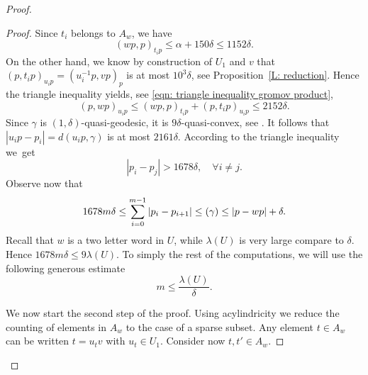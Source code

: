 \documentclass[11pt]{article}
\newcommand{\NoChangel}[1]{%
\expandafter\let\csname old\string#1\endcsname=#1
\let#1=\relax
\newcommand{#1}{\mathcode`l="716C\csname old\string#1\endcsname\mathcode`l="7160 }%
}
\theoremstyle{plain}
\theoremstyle{definition}
\DeclareMathOperator{\length}{length}\NoChangel{\length}
\begin{document}
\begin{proof}
\begin{proof}
Since $t_i$ belongs to $A_w$, we have
\begin{equation*}
(wp,p)_{t_ip} \leq \alpha + 150\delta \leq 1152\delta.
\end{equation*}
On the other hand, we know by construction of $U_1$ and $v$ that $(p,t_ip)_{u_ip} = (u_i^{-1}p,vp)_p$ is at most $10^3\delta$, see Proposition~\ref{L: reduction}.
Hence the triangle inequality yields, see \eqref{eqn: triangle inequality gromov product},
\begin{equation*}
(p,wp)_{u_ip} \leq (wp,p)_{t_ip} + (p,t_ip)_{u_ip} \leq 2152\delta.
\end{equation*}
Since $\gamma$ is $(1, \delta)$-quasi-geodesic, it is $9\delta$-quasi-convex, see \cite[Cor.\,2.7(2)]{coulon_geometry_2014}.
It follows that $|u_ip - p_i| = d(u_ip,\gamma)$ is at most $2161\delta$.
According to the triangle inequality we~get
\begin{equation*}
|p_i - p_j| > 1678\delta,\quad \forall i \neq j.
\end{equation*}
Observe now that
\begin{equation*}
1678m\delta \leq \sum_{i = 0}^{m-1} |p_i - p_{i+1}|
\leq \length(\gamma) \leq |p - wp| + \delta.
\end{equation*}
Recall that $w$ is a two letter word in $U$, while $\lambda(U)$ is very large compare to $\delta$.
Hence $1678m\delta \leq 9\lambda(U)$.
To simply the rest of the computations, we will use the following generous estimate
\begin{equation*}
m \leq \frac{ \lambda(U)}\delta.
\end{equation*}

We now start the second step of the proof.
Using acylindricity we reduce the counting of elements in $A_w$ to the case of a sparse subset.
Any element $t \in A_w$ can be written $t = u_tv$ with $u_t \in U_1$.
Consider now $t,t' \in A_w$.


\end{proof}
\end{proof}
\end{document}
